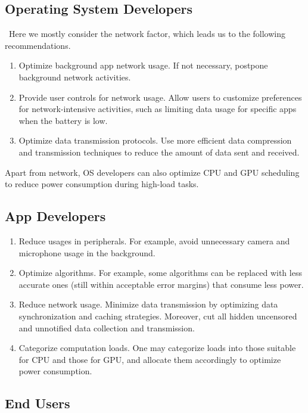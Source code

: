 \documentclass[12pt]{article}
\begin{document}
\subsection{Operating System Developers}

\quad \, Here we mostly consider the network factor, which leads us to the following recommendations.

\begin{enumerate}
	\item Optimize background app network usage. If not necessary, postpone background network activities. 
	\item Provide user controls for network usage. Allow users to customize preferences for network-intensive activities, such as limiting data usage for specific apps when the battery is low.
	\item Optimize data transmission protocols. Use more efficient data compression and transmission techniques to reduce the amount of data sent and received.
\end{enumerate}

Apart from network, OS developers can also optimize CPU and GPU scheduling to reduce power consumption during high-load tasks. 

\subsection{App Developers}

\begin{enumerate}
	\item Reduce usages in peripherals. For example, avoid unnecessary camera and microphone usage in the background.
	\item Optimize algorithms. For example, some algorithms can be replaced with less accurate ones (still within acceptable error margins) that consume less power.
	\item Reduce network usage. Minimize data transmission by optimizing data synchronization and caching strategies. Moreover, cut all hidden uncensored and unnotified data collection and transmission. 
	\item Categorize computation loads. One may categorize loads into those suitable for CPU and those for GPU, and allocate them accordingly to optimize power consumption.
\end{enumerate}

\subsection{End Users}
\end{document}
